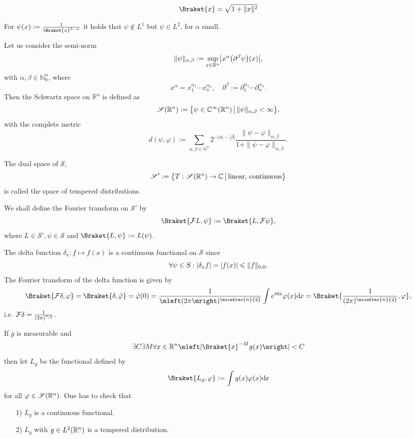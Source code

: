 \documentclass[12pt]{article}
\numberwithin{equation}{section}
\theoremstyle{plain}
\theoremstyle{plain}
\renewcommand{\d}{\mathrm{d}\hspace{-0.025cm}}
\renewcommand{\phi}{\varphi}
\begin{document}
\begin{defn}
	\[
		\Braket{x} = \sqrt{1+\|x\|^2}	
	\]
\end{defn}

For $\psi(x):= \frac{1}{\Braket{x}^{3-\alpha}}$ it holds that $\psi \notin L^1$ but $\psi \in L^2$, for $\alpha$ small.

\begin{defn}
	Let us consider the semi-norm
	\[
		\|\psi\|_{\alpha, \beta} := \sup_{x \in \mathbb{R}^n} \mleft| x^\alpha \mleft( \partial^\beta \psi \mright)(x) \mright|,	
	\]
	with $\alpha, \beta \in \mathbb{N}_0^{n}$, where 
	\[
		x^\alpha= x^{\alpha_1}_1 \cdots x^{\alpha_n}_n, \quad \partial^\beta := \partial^{\alpha_1}_1	\cdots \partial^{\alpha_n}_n.
	\]
	Then the Schwartz space on $\mathbb{R}^n$ is defined as
	\[
		\mathscr S \mleft( \mathbb{R}^n \mright) := \mleft\{ \psi \in \mathbb{C}^{\infty} \mleft( \mathbb{R}^n \mright) \, \big| \, \|\psi\|_{\alpha, \beta} < \infty \mright\},
	\]
	with the complete metric 
	\[
		d(\psi,\phi) := \sum_{\alpha, \beta \in \mathbb{N}^n} 2^{-|\alpha|-|\beta|}	\frac{\|\psi-\phi\|_{\alpha,\beta}}{1+\|\psi-\phi\|_{\alpha,\beta}}.
	\]
\end{defn}
\begin{defn}
	The dual space of $\mathscr{S}$, 
	\[
		\mathscr{S}' := \mleft\{ T : \mathscr{S}\mleft(\mathbb{R}^n \mright) \rightarrow \mathbb{C} \, \big| \, \text{linear, continuous} \mright\}	
	\]
	is called the space of tempered distributions.
\end{defn}

We shall define the Fourier transform on $\mathcal S'$ by 
\[
	\Braket{\mathcal FL , \psi} := \Braket{L, \mathcal F \psi},
\]
where $L \in \mathscr S', \psi \in \mathscr S$ and $\Braket{L,\psi}:= L(\psi)$.

The delta function $\delta_x : f \mapsto f(x)$ is a continuous functional on $\mathcal S$ since
\[
	\forall \psi \in S: \mleft| \delta_x f \mright| = |f(x)| \leqslant \|f\|_{0,0}.
\]
The Fourier transform of the delta function is given by
\[
	\Braket{\mathcal F \delta , \phi} = \Braket{\delta, \hat \phi} = \hat \phi(0) = \frac{1}{\mleft(2\pi \mright)^{\nicefrac{n}{2}}} \int e^{i 0 x} \phi(x) \d x = \Braket{\frac{1}{(2\pi)^{\nicefrac{n}{2}}}, \phi},
\]
i.e. $\mathcal F \delta = \frac{1}{(2\pi)^{\nicefrac{n}{2}}}$.


If $g$ is measurable and 
\[
	\exists C \exists M \forall x \in \mathbb{R}^n \mleft| \Braket{x}^{-M} g(x) \mright| < C
\]
then let $L_g$ be the functional defined by
\[
	\Braket{L_g, \phi}:= \int g(x) \phi(x) \d x
\]
for all $\phi \in \mathscr S\mleft(\mathbb{R}^n \mright)$.
One has to check that 
\begin{enumerate}
	\item[1)] $L_g$ is a continuous functional.
	\item[2)] $L_g$ with $g \in L^2 \mleft( \mathbb{R}^n \mright)$ is a tempered distribution.
\end{enumerate}
\end{document}

